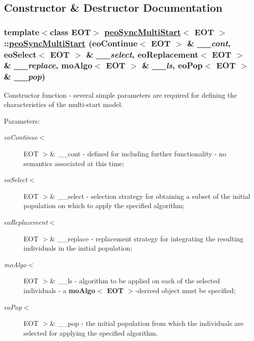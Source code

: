\subsection{Constructor \& Destructor Documentation}
\hypertarget{classpeoSyncMultiStart_d29f94aad3c1f443bfffc8b6aee0704c}{
\subsubsection[peoSyncMultiStart]{\setlength{\rightskip}{0pt plus 5cm}template$<$class EOT$>$ \hyperlink{classpeoSyncMultiStart}{peo\-Sync\-Multi\-Start}$<$ EOT $>$::\hyperlink{classpeoSyncMultiStart}{peo\-Sync\-Multi\-Start} (eo\-Continue$<$ EOT $>$ \& {\em \_\-\_\-cont}, eo\-Select$<$ EOT $>$ \& {\em \_\-\_\-select}, eo\-Replacement$<$ EOT $>$ \& {\em \_\-\_\-replace}, mo\-Algo$<$ EOT $>$ \& {\em \_\-\_\-ls}, eo\-Pop$<$ EOT $>$ \& {\em \_\-\_\-pop})}}
\label{classpeoSyncMultiStart_d29f94aad3c1f443bfffc8b6aee0704c}


Constructor function - several simple parameters are required for defining the characteristics of the multi-start model. 

\begin{Desc}
\item[Parameters:]
\begin{description}
\item[{\em eo\-Continue$<$}]EOT $>$\& \_\-\_\-cont - defined for including further functionality - no semantics associated at this time; \item[{\em eo\-Select$<$}]EOT $>$\& \_\-\_\-select - selection strategy for obtaining a subset of the initial population on which to apply the specified algorithm; \item[{\em eo\-Replacement$<$}]EOT $>$\& \_\-\_\-replace - replacement strategy for integrating the resulting individuals in the initial population; \item[{\em mo\-Algo$<$}]EOT $>$\& \_\-\_\-ls - algorithm to be applied on each of the selected individuals - a {\bf mo\-Algo$<$ EOT $>$}-derived object must be specified; \item[{\em eo\-Pop$<$}]EOT $>$\& \_\-\_\-pop - the initial population from which the individuals are selected for applying the specified algorithm. \end{description}
\end{Desc}


